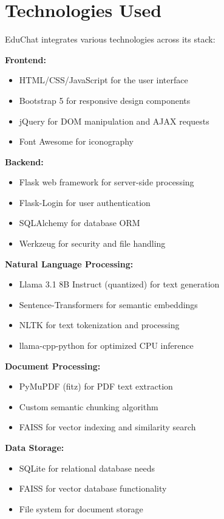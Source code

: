 \documentclass[12pt]{article}
\begin{document}
\section{Technologies Used}
EduChat integrates various technologies across its stack:

\textbf{Frontend:}
\begin{itemize}[leftmargin=2em]
    \item HTML/CSS/JavaScript for the user interface
    \item Bootstrap 5 for responsive design components
    \item jQuery for DOM manipulation and AJAX requests
    \item Font Awesome for iconography
\end{itemize}

\textbf{Backend:}
\begin{itemize}[leftmargin=2em]
    \item Flask web framework for server-side processing
    \item Flask-Login for user authentication
    \item SQLAlchemy for database ORM
    \item Werkzeug for security and file handling
\end{itemize}

\textbf{Natural Language Processing:}
\begin{itemize}[leftmargin=2em]
    \item Llama 3.1 8B Instruct (quantized) for text generation
    \item Sentence-Transformers for semantic embeddings
    \item NLTK for text tokenization and processing
    \item llama-cpp-python for optimized CPU inference
\end{itemize}

\textbf{Document Processing:}
\begin{itemize}[leftmargin=2em]
    \item PyMuPDF (fitz) for PDF text extraction
    \item Custom semantic chunking algorithm
    \item FAISS for vector indexing and similarity search
\end{itemize}

\textbf{Data Storage:}
\begin{itemize}[leftmargin=2em]
    \item SQLite for relational database needs
    \item FAISS for vector database functionality
    \item File system for document storage
\end{itemize}
\end{document}
